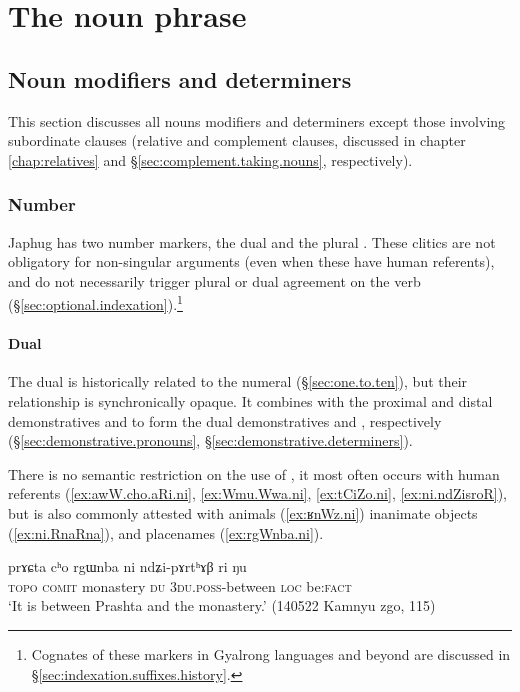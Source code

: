 \chapter{The noun phrase} \label{chap:noun.phrase}


\section{Noun modifiers and determiners} \label{sec:determiners}
This section discusses all nouns modifiers and determiners except those involving subordinate clauses (relative and complement clauses, discussed in chapter \ref{chap:relatives} and §\ref{sec:complement.taking.nouns}, respectively). 
 
\subsection{Number}  \label{sec:number.determiners}
Japhug has two number markers, the dual  and the plural . These clitics are not obligatory for non-singular arguments (even when these have human referents), and do not necessarily trigger plural or dual agreement on the verb (§\ref{sec:optional.indexation}).\footnote{Cognates of these markers in Gyalrong languages and beyond are discussed in §\ref{sec:indexation.suffixes.history}. }

\subsubsection{Dual} \label{sec:dual.determiners}
The dual  is historically related to the numeral  (§\ref{sec:one.to.ten}), but their relationship is synchronically opaque. It combines with the proximal and distal demonstratives  and  to form the dual demonstratives  and , respectively (§\ref{sec:demonstrative.pronouns}, §\ref{sec:demonstrative.determiners}).

There is no semantic restriction on the use of , it most often occurs with human referents (\ref{ex:awW.cho.aRi.ni}, \ref{ex:Wmu.Wwa.ni}, \ref{ex:tCiZo.ni}, \ref{ex:ni.ndZisroR}), but is also commonly attested with animals (\ref{ex:ʁnWz.ni}) inanimate objects (\ref{ex:ni.RnaRna}), and placenames (\ref{ex:rgWnba.ni}). 

\begin{exe}
\ex \label{ex:rgWnba.ni}
\gll prɤɕta cʰo rgɯnba ni ndʑi-pɤrtʰɤβ ri ŋu \\
\textsc{topo} \textsc{comit} monastery \textsc{du} \textsc{3du}.\textsc{poss}-between \textsc{loc} be:\textsc{fact} \\
\glt `It is between Prashta and the monastery.' (140522 Kamnyu zgo, 115)
\end{exe}

